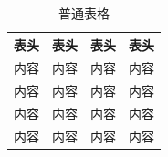 \begin{table}[htbp]
  \centering
  \caption{普通表格}
  \label{tab:pinci}
    \begin{tabularx}{0.9\textwidth} { 
        >{\centering\arraybackslash}X 
        >{\centering\arraybackslash}X 
        >{\centering\arraybackslash}X 
        >{\centering\arraybackslash}X 
        }
        \toprule
        表头 & 表头 & 表头 & 表头 \\
        \midrule
        内容 & 内容 & 内容 & 内容 \\
        内容 & 内容 & 内容 & 内容 \\
        内容 & 内容 & 内容 & 内容 \\
        内容 & 内容 & 内容 & 内容 \\
        \bottomrule
    \end{tabularx}
\end{table}
